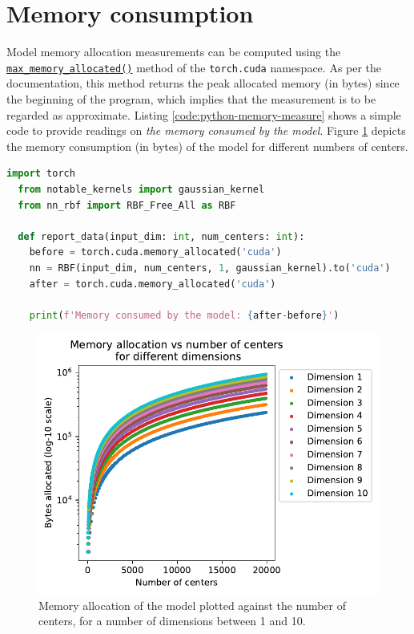 \documentclass[12pt]{report} %
\begin{document}
\section*{Memory consumption}

Model memory allocation measurements can be computed using the
\href{https://pytorch.org/docs/stable/generated/torch.cuda.max_memory_allocated.html}{\texttt{max\_memory\_allocated()}}
method of the \texttt{torch.cuda} namespace. As per the documentation,
this method returns the peak allocated memory (in bytes) since the beginning of the program, which implies that the
measurement is to be regarded as approximate. Listing \ref{code:python-memory-measure} shows a simple code to
provide readings on \textit{the memory consumed by the model}.
Figure \ref{fig:model-consumption-memory} depicts the memory consumption (in bytes) of the
model for different numbers of centers.

\begin{lstlisting}[language=Python, caption=Simple memory consumption measurement., label=code:python-memory-measure]
  import torch
  from notable_kernels import gaussian_kernel
  from nn_rbf import RBF_Free_All as RBF

  def report_data(input_dim: int, num_centers: int):
    before = torch.cuda.memory_allocated('cuda')
    nn = RBF(input_dim, num_centers, 1, gaussian_kernel).to('cuda')
    after = torch.cuda.memory_allocated('cuda')

    print(f'Memory consumed by the model: {after-before}')
  \end{lstlisting}

\begin{figure}[ht]
  \includegraphics[width=.7\textwidth]{imagenes/model_consumption/Memory_allocation_vs_number_of_centers.pdf}
  \caption{Memory allocation of the model plotted against the number of centers, for
    a number of dimensions between 1 and 10.}
  \label{fig:model-consumption-memory}
\end{figure}
\end{document}
